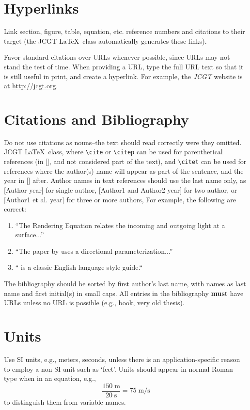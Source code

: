 \documentclass{jcgt}
\begin{document}
\section{Hyperlinks}
Link section, figure, table, equation, etc. reference numbers and citations to their target (the JCGT \LaTeX\ class automatically generates these links).

Favor standard citations over URLs whenever possible, since URLs may not stand the test of time.  When providing a URL, type the full URL text so that it is still useful in print, and create a hyperlink.  For example,
the \textit{JCGT} website is at \href{http://jcgt.org}{http://jcgt.org}.

\section{Citations and Bibliography}
Do not use citations as nouns--the text should read correctly were they omitted. JCGT \LaTeX\ class, where \lstinline{\cite} or \lstinline{\citep} can be used for parenthetical references (in [], and not considered part of the text), and \lstinline{\citet} can be used for references where the author(s) name will appear as part of the sentence, and the year in [] after. Author names in text references should use the last name only, as [Author year] for single author, [Author1 and Author2 year] for two author, or [Author1 et al. year] for three or more authors, For example, the following are correct:

\begin{enumerate}
\item ``The Rendering Equation \cite{Immel:1986:RMN:15886.15901,Kajiya:1986:RE:15922.15902} relates the incoming and outgoing light at a surface...''
\item ``The paper by \citet{Immel:1986:RMN:15886.15901} uses a directional parameterization...''
\item `` is a classic English language style guide.``
\end{enumerate}

\noindent The bibliography should be sorted by first author's last name, with names as last name and first initial(s) in small caps. All entries in the bibliography \textbf{must} have URLs unless no URL is possible (e.g., book, very old thesis).

\section{Units}
Use SI units, e.g., meters, seconds, unless there is an application-specific reason to employ a non SI-unit such as `feet'.  Units should appear in normal Roman type when in an equation, e.g.,
%
\begin{equation}
\frac{150\;\mathrm{m}}{20\;\mathrm{s}} = 75\;\mathrm{m}/\mathrm{s}
\end{equation}
%
to distinguish them from variable names.
\end{document}

